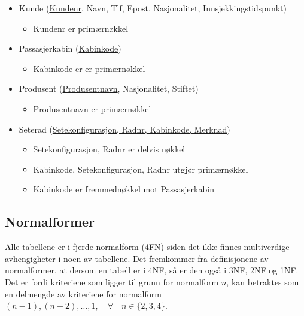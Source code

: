 \documentclass[a4paper,11pt, norsk]{article}
\begin{document}
\begin{itemize}[noitemsep,topsep=0pt,parsep=0pt,partopsep=0pt]
\item Kunde (\underline{Kundenr}, Navn, Tlf, Epost, Nasjonalitet, \mbox{Innsjekkingstidspunkt})
\begin{itemize}
\item Kundenr er primærnøkkel
\end{itemize}

\item Passasjerkabin (\underline{Kabinkode})
\begin{itemize}
\item Kabinkode er er primærnøkkel
\end{itemize}

\item Produsent (\underline{Produsentnavn}, Nasjonalitet, Stiftet)
\begin{itemize}
\item Produsentnavn er primærnøkkel
\end{itemize}

\item Seterad (\underline{Setekonfigurasjon, Radnr, Kabinkode, Merknad})
\begin{itemize}
\item Setekonfigurasjon, Radnr er delvis nøkkel
\item Kabinkode, Setekonfigurasjon, Radnr utgjør primærnøkkel
\item Kabinkode er fremmednøkkel mot Passasjerkabin 
\end{itemize}

\end{itemize}

\subsection{Normalformer}
Alle tabellene er i fjerde normalform (4FN) siden det ikke finnes
multiverdige avhengigheter i noen av tabellene. Det fremkommer fra definisjonene av normalformer, at dersom en tabell er i 4NF, så er den også i 3NF, 2NF og 1NF. Det er fordi kriteriene som ligger til grunn for normalform $n$, kan betraktes som en delmengde av kriteriene for normalform $(n-1), (n-2), \ldots, 1, \quad \forall \quad n \in \{2,3,4\}$.
\end{document}
